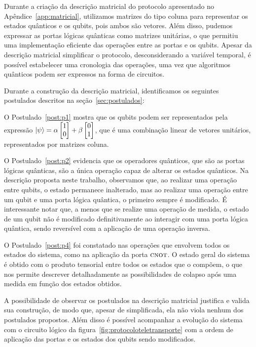 Durante a criação da descrição matricial do protocolo apresentado no Apêndice~\ref{app:matricial}, utilizamos matrizes do tipo coluna para representar os estados quânticos e os qubits, pois ambos são vetores. Além disso, pudemos expressar as portas lógicas quânticas como matrizes unitárias, o que permitiu uma implementação eficiente das operações entre as portas e os qubits. Apesar da descrição matricial simplificar o protocolo, desconsiderando a variável temporal, é possível estabelecer uma cronologia das operações, uma vez que algoritmos quânticos podem ser expressos na forma de circuitos.

Durante a construção da descrição matricial, identificamos os seguintes postulados descritos na seção~\ref{sec:postulados}:

\begin{description}
\item O Postulado~\ref{post:p1} mostra que os qubits podem ser representados pela expressão $\ket{\psi} = \alpha \begin{bmatrix} 1 \\ 0 \end{bmatrix} + \beta \begin{bmatrix} 0 \\ 1 \end{bmatrix}$, que é uma combinação linear de vetores unitários, representados por matrizes coluna.
\item O Postulado~\ref{post:p2} evidencia que os operadores quânticos, que são as portas lógicas quânticas, são a única operação capaz de alterar os estados quânticos. Na descrição proposta neste trabalho, observamos que, ao realizar uma operação entre qubits, o estado permanece inalterado, mas ao realizar uma operação entre um qubit e uma porta lógica quântica, o primeiro sempre é modificado. É interessante notar que, a menos que se realize uma operação de medida, o estado de um qubit não é modificado definitivamente ao interagir com uma porta lógica quântica, sendo reversível com a aplicação de uma operação inversa.
\item O Postulado~\ref{post:p4} foi constatado nas operações que envolvem todos os estados do sistema, como na aplicação da porta \(\operatorname{\textsc{cnot}}\). O estado geral do sistema é obtido com o produto tensorial entre todos os estados que o compõem, o que nos permite descrever detalhadamente as possibilidades de colapso após uma medida em função dos estados obtidos.
\end{description}

A possibilidade de observar os postulados na descrição matricial justifica e valida sua construção, de modo que, apesar de simplificada, ela não viola nenhum dos postulados propostos. Além disso é possível acompanhar a evolução do sistema com o circuito lógico da figura~\ref{fig:protocoloteletransporte} com a ordem de aplicação das portas e os estados dos qubits sendo modificados.

